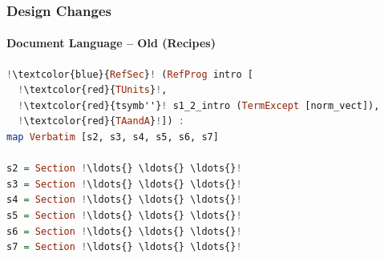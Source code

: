 \documentclass{beamer}
\begin{document}

%
%


%
%
%


%
%
%
%

\begin{frame}[fragile]

\frametitle{Design Changes}
\framesubtitle{Document Language -- Old (Recipes)}

\begin{lstlisting}[language=Haskell, frame=single, showstringspaces=false, basicstyle=\scriptsize, escapechar=!]
!\textcolor{blue}{RefSec}! (RefProg intro [
  !\textcolor{red}{TUnits}!, 
  !\textcolor{red}{tsymb''}! s1_2_intro (TermExcept [norm_vect]),
  !\textcolor{red}{TAandA}!]) : 
map Verbatim [s2, s3, s4, s5, s6, s7]

s2 = Section !\ldots{} \ldots{} \ldots{}!
s3 = Section !\ldots{} \ldots{} \ldots{}!
s4 = Section !\ldots{} \ldots{} \ldots{}!
s5 = Section !\ldots{} \ldots{} \ldots{}!
s6 = Section !\ldots{} \ldots{} \ldots{}!
s7 = Section !\ldots{} \ldots{} \ldots{}!

\end{lstlisting} 
\end{frame}

\end{document}
